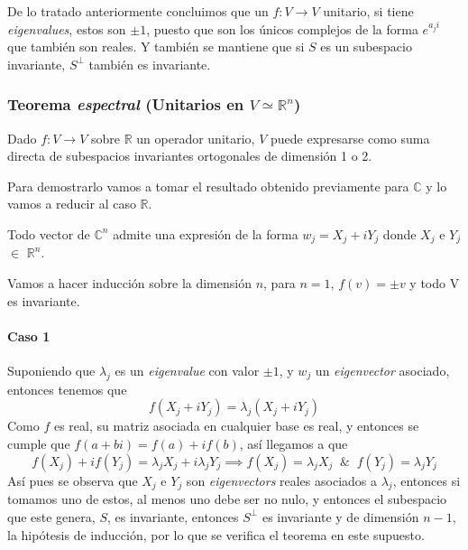 \documentclass{preset}
\begin{document}
De lo tratado anteriormente concluimos que un $f: V \rightarrow V$ unitario, si tiene \textit{eigenvalues}, estos son $\pm 1$, puesto que son los únicos complejos de la forma $e^{a_j i}$ que también son reales. Y también se mantiene que si $S$ es un subespacio invariante, $S^\perp$ también es invariante.

\vspace{-15pt}
\subsubsection{Teorema \textit{espectral} (Unitarios en $V\simeq \mathbb{R}^n$)}

Dado $f: V \rightarrow V$ sobre $\mathbb{R}$ un operador unitario, $V$ puede expresarse como suma directa de subespacios invariantes ortogonales de dimensión 1 o 2.

Para demostrarlo vamos a tomar el resultado obtenido previamente para $\mathbb{C}$ y lo vamos a reducir al caso $\mathbb{R}$.

Todo vector de $\mathbb{C}^n$ admite una expresión de la forma $w_j = X_j + i Y_j$ donde $X_j$ e $Y_j$ $\in$ $\mathbb{R}^n$.

\noindent Vamos a hacer inducción sobre la dimensión $n$, para $n=1$, $f(v)=\pm v$ y todo V es invariante.

\vspace{-10pt}
\paragraph{Caso 1} Suponiendo que $\lambda_j$ es un \textit{eigenvalue} con valor $\pm 1$, y $w_j$ un \textit{eigenvector} asociado, entonces tenemos que 
\vspace{-10pt}
\[f(X_j+iY_j)=\lambda_j(X_j+iY_j)\]
Como $f$ es real, su matriz asociada en cualquier base es real, y entonces se cumple que $f(a+bi)=f(a)+i f(b)$, así llegamos a que
\vspace{-5pt}
\[f(X_j)+i f(Y_j) = \lambda_j X_j + i \lambda_j Y_j \implies f(X_j)=\lambda_j X_j \;\; \& \;\; f(Y_j)= \lambda_j Y_j\]
\vspace{-5pt}
Así pues se observa que $X_j$ e $Y_j$ son \textit{eigenvectors} reales asociados a $\lambda_j$, entonces si tomamos uno de estos, al menos uno debe ser no nulo, y entonces el subespacio que este genera, $S$, es invariante, entonces $S^\perp$ es invariante y de dimensión $n-1$, la hipótesis de inducción, por lo que se verifica el teorema en este supuesto.

\vspace{-10pt}
\end{document}
